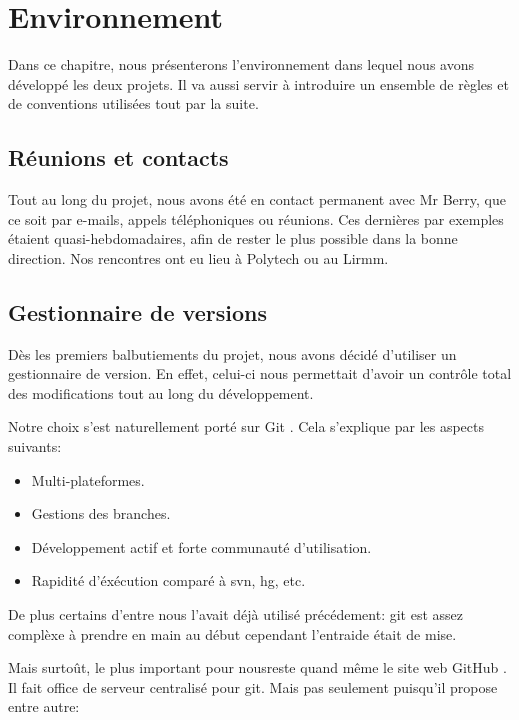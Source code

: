 \chapter{Environnement}
    Dans ce chapitre, nous présenterons l'environnement dans lequel nous avons
    développé les deux projets. Il va aussi servir à introduire un ensemble de
    règles et de conventions utilisées tout par la suite.

\newpage
    \section{Réunions et contacts}
        Tout au long du projet, nous avons été en contact permanent avec Mr Berry,
    que ce soit par e-mails, appels téléphoniques ou réunions. Ces dernières par
    exemples étaient quasi-hebdomadaires, afin de rester le plus possible dans la
    bonne direction. Nos rencontres ont eu lieu à Polytech ou au Lirmm.


    \section{Gestionnaire de versions}
        Dès les premiers balbutiements du projet, nous avons décidé d'utiliser un 
        gestionnaire de version. En effet, celui-ci nous permettait d'avoir un contrôle
        total des modifications tout au long du développement.

    Notre choix s'est naturellement porté sur Git \cite{git}. Cela s'explique 
    par les aspects suivants:

    \begin{itemize}
    \item Multi-plateformes.
    \item Gestions des branches.
    \item Développement actif et forte communauté d'utilisation.
    \item Rapidité d'éxécution comparé à svn, hg, etc. 
    \end{itemize}

    De plus certains d'entre nous l'avait déjà utilisé précédement: git est assez
    complèxe à prendre en main au début cependant l'entraide était de mise.

    Mais surtoût, le plus important pour nousreste quand même le site web GitHub \cite{github}.
    Il fait office de serveur centralisé pour git. Mais pas seulement puisqu'il 
    propose entre autre:

